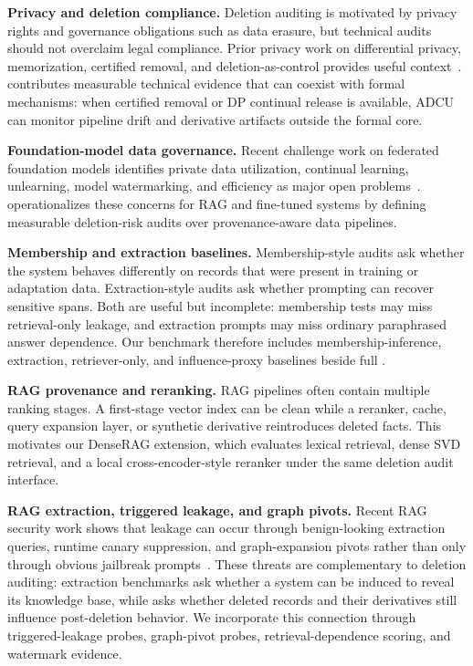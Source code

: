 \textbf{Privacy and deletion compliance.}
Deletion auditing is motivated by privacy rights and governance obligations such as data erasure, but technical audits should not overclaim legal compliance. Prior privacy work on differential privacy, memorization, certified removal, and deletion-as-control provides useful context~\cite{dwork2006dp,voigt2017gdpr,guo2020certified,cohen2022deletioncontrol}. \method{} contributes measurable technical evidence that can coexist with formal mechanisms: when certified removal or DP continual release is available, ADCU can monitor pipeline drift and derivative artifacts outside the formal core.

\textbf{Foundation-model data governance.}
Recent challenge work on federated foundation models identifies private data utilization, continual learning, unlearning, model watermarking, and efficiency as major open problems~\cite{fan2025fedfmchallenges}. \method{} operationalizes these concerns for RAG and fine-tuned systems by defining measurable deletion-risk audits over provenance-aware data pipelines.

\textbf{Membership and extraction baselines.}
Membership-style audits ask whether the system behaves differently on records that were present in training or adaptation data. Extraction-style audits ask whether prompting can recover sensitive spans. Both are useful but incomplete: membership tests may miss retrieval-only leakage, and extraction prompts may miss ordinary paraphrased answer dependence. Our benchmark therefore includes membership-inference, extraction, retriever-only, and influence-proxy baselines beside full \method{}.

\textbf{RAG provenance and reranking.}
RAG pipelines often contain multiple ranking stages. A first-stage vector index can be clean while a reranker, cache, query expansion layer, or synthetic derivative reintroduces deleted facts. This motivates our DenseRAG extension, which evaluates lexical retrieval, dense SVD retrieval, and a local cross-encoder-style reranker under the same deletion audit interface.

\textbf{RAG extraction, triggered leakage, and graph pivots.}
Recent RAG security work shows that leakage can occur through benign-looking extraction queries, runtime canary suppression, and graph-expansion pivots rather than only through obvious jailbreak prompts~\cite{wang2025ikea,xie2026canaryrag,song2026grasp,thornton2026retrievalpivot}. These threats are complementary to deletion auditing: extraction benchmarks ask whether a system can be induced to reveal its knowledge base, while \method{} asks whether deleted records and their derivatives still influence post-deletion behavior. We incorporate this connection through triggered-leakage probes, graph-pivot probes, retrieval-dependence scoring, and watermark evidence.

